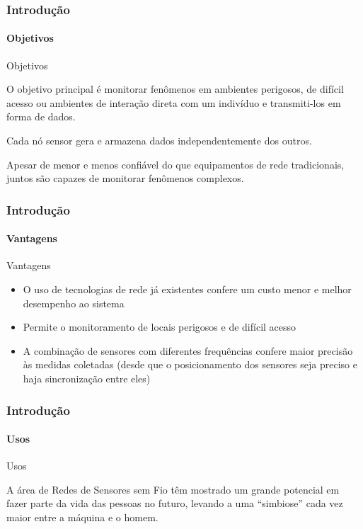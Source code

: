 \documentclass[notes]{beamer}
\begin{document}
\begin{frame}
\label{slide_7}
\frametitle{Introdução}
\framesubtitle{Objetivos}

\begin{block}{Objetivos}

O objetivo principal é monitorar fenômenos em ambientes perigosos, de difícil acesso ou ambientes de interação direta com um indivíduo e transmiti-los em forma de dados. 
\end{block} \pause

\begin{block}

Cada nó sensor gera e armazena dados independentemente dos outros.

\end{block} \pause

\begin{block}

Apesar de menor e menos confiável do que equipamentos de rede tradicionais, juntos são capazes de monitorar fenômenos complexos. 

\end{block}

\end{frame}

\begin{frame}
\label{slide_8}
\frametitle{Introdução}
\framesubtitle{Vantagens}

\begin{block}{Vantagens}

\begin{itemize}

\item O uso de tecnologias de rede já existentes confere um custo menor e melhor desempenho ao sistema \pause

\item Permite o monitoramento de locais perigosos e de difícil acesso \pause

\item A combinação de sensores com diferentes frequências confere maior precisão às medidas coletadas (desde que o posicionamento dos sensores seja preciso e haja sincronização entre eles) 

\end{itemize}

\end{block}

\end{frame}

\begin{frame}
\label{slide_9}
\frametitle{Introdução}
\framesubtitle{Usos}

\begin{block}{Usos}

A área de Redes de Sensores sem Fio têm mostrado um grande potencial em fazer parte da vida das pessoas no futuro, levando a uma “simbiose” cada vez maior entre a máquina e o homem\nocite{Redes_Sensores}. 

\end{block}

\end{frame}
\end{document}
